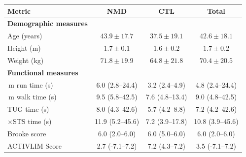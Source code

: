 \documentclass[border=6pt]{standalone}
\begin{document}
\begin{tabular}{lccc}
\toprule
\textbf{Metric} & \textbf{NMD} & \textbf{CTL} & \textbf{Total} \\
\midrule
\textbf{Demographic measures} & & & \\
\quad Age (years) & $43.9 \pm 17.7$ & $37.5 \pm 19.1$ & $42.6 \pm 18.1$ \\
\quad Height (m) & $1.7 \pm 0.1$ & $1.6 \pm 0.2$ & $1.7 \pm 0.2$ \\
\quad Weight (kg) & $71.8 \pm 19.9$ & $64.8 \pm 21.8$ & $70.4 \pm 20.5$ \\
\textbf{Functional measures} & & & \\
\quad 10\,m run time (s) & 6.0 (2.8--24.4) & 3.2 (2.4--4.9) & 4.8 (2.4--24.4) \\
\quad 10\,m walk time (s) & 9.5 (5.8--42.5) & 7.6 (4.8--13.4) & 9.0 (4.8--42.5) \\
\quad TUG time (s) & 8.0 (4.3--42.6) & 5.7 (4.2--8.8) & 7.2 (4.2--42.6) \\
\quad 5$\times$STS time (s) & 11.9 (5.2--45.6) & 7.2 (3.9--17.8) & 10.8 (3.9--45.6) \\
\quad Brooke score & 6.0 (2.0--6.0) & 6.0 (5.0--6.0) & 6.0 (2.0--6.0) \\
\quad ACTIVLIM Score & 2.7 (-7.1--7.2) & 7.2 (4.3--7.2) & 3.5 (-7.1--7.2) \\
\bottomrule
\end{tabular}
\end{document}

